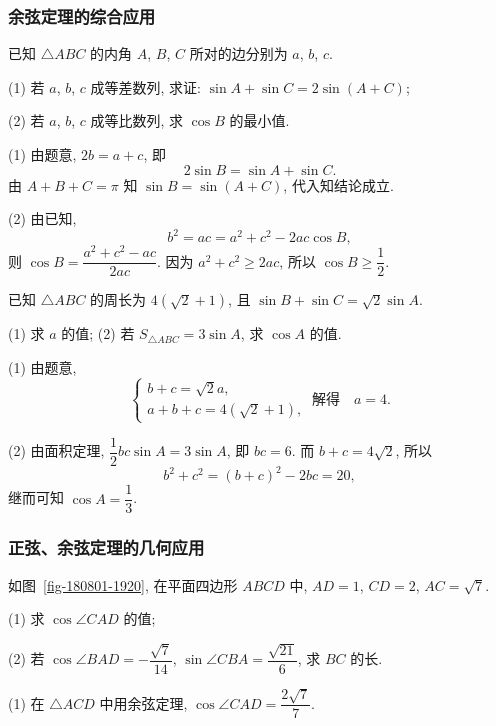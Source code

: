 \subsubsection{余弦定理的综合应用}
\begin{example}
    已知 $\triangle ABC$ 的内角 $A$, $B$, $C$ 所对的边分别为 $a$, $b$, $c$.
    
    (1) 若 $a$, $b$, $c$ 成等差数列, 求证: $\sin A+\sin C=2\sin (A+C)$;
    
    (2) 若 $a$, $b$, $c$ 成等比数列, 求 $\cos B$ 的最小值.
\end{example}
\beginsolution
    (1) 由题意, $2b= a+c$, 即
    \[2\sin B= \sin A+ \sin C.\]
    由 $A+B+C= \pi$ 知 $\sin B= \sin(A+C)$, 代入知结论成立.

    (2) 由已知,
    \[b^2= ac= a^2+c^2- 2ac\cos B,\]
    则 $\cos B= \dfrac{a^2+c^2- ac}{2ac}$. 
    因为 $a^2+c^2\geqslant 2ac$, 所以 $\cos B\geqslant \dfrac12$.
\endsolution

\lianxi
\begin{exercise}[s]
    已知 $\triangle ABC$ 的周长为 $4(\sqrt2+1)$, 且 $\sin B+\sin C=\sqrt2\sin A$.
    
    (1) 求 $a$ 的值;\qquad
    (2) 若 $S_{\triangle ABC}= 3\sin A$, 求 $\cos A$ 的值.
\end{exercise}
\beginsolution
    (1) 由题意,
    \[\left\{\!\!\begin{array}{l}
        b+c= \sqrt2 a,\\
        a+b+c= 4(\sqrt2+ 1),
    \end{array}\right.\ \text{解得}\quad a=4.\]

    (2) 由面积定理, $\dfrac12 bc\sin A= 3\sin A$, 即 $bc= 6$. 而 $b+c= 4\sqrt2$, 所以
    \[b^2+c^2= (b+c)^2- 2bc= 20,\]
    继而可知 $\cos A= \dfrac13$.
\endsolution

\subsubsection{正弦、余弦定理的几何应用}

\begin{example}
    如图~\ref{fig-180801-1920}, 在平面四边形 $ABCD$ 中, $AD=1$, $CD=2$, $AC=\sqrt7$.
    
    (1) 求 $\cos\angle CAD$ 的值;
    
    (2) 若 $\cos\angle BAD=-\dfrac{\sqrt7}{14}$, $\sin \angle CBA=\dfrac{\sqrt{21}}6$, 求 $BC$ 的长.
\end{example}
\beginsolution
    (1) 在 $\triangle ACD$ 中用余弦定理, $\cos\angle CAD= \dfrac{2\sqrt7}7$.

